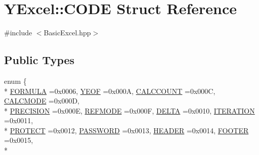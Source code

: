 \hypertarget{struct_y_excel_1_1_c_o_d_e}{}\section{Y\+Excel\+:\+:C\+O\+D\+E Struct Reference}
\label{struct_y_excel_1_1_c_o_d_e}


{\ttfamily \#include $<$Basic\+Excel.\+hpp$>$}

\subsection*{Public Types}
\begin{DoxyCompactItemize}
\item 
enum \{ \\*
\hyperlink{struct_y_excel_1_1_c_o_d_e_ae0c6be2dfa10f19c36be94a85829b00cab350171cc6990a3289727bf2ceb050f6}{F\+O\+R\+M\+U\+L\+A} =0x0006, 
\hyperlink{struct_y_excel_1_1_c_o_d_e_ae0c6be2dfa10f19c36be94a85829b00caa0f0515627add6e0d9c7cc15f8e5aa80}{Y\+E\+O\+F} =0x000\+A, 
\hyperlink{struct_y_excel_1_1_c_o_d_e_ae0c6be2dfa10f19c36be94a85829b00cabee0312e062953c2f4d948ba2feb941e}{C\+A\+L\+C\+C\+O\+U\+N\+T} =0x000\+C, 
\hyperlink{struct_y_excel_1_1_c_o_d_e_ae0c6be2dfa10f19c36be94a85829b00cae16abef91417753bf3d1b765470bc5ba}{C\+A\+L\+C\+M\+O\+D\+E} =0x000\+D, 
\\*
\hyperlink{struct_y_excel_1_1_c_o_d_e_ae0c6be2dfa10f19c36be94a85829b00cad18be021e63a4dadf61dbb1b9986167b}{P\+R\+E\+C\+I\+S\+I\+O\+N} =0x000\+E, 
\hyperlink{struct_y_excel_1_1_c_o_d_e_ae0c6be2dfa10f19c36be94a85829b00ca5186e9e84c3efedd4e9da17a38549fcb}{R\+E\+F\+M\+O\+D\+E} =0x000\+F, 
\hyperlink{struct_y_excel_1_1_c_o_d_e_ae0c6be2dfa10f19c36be94a85829b00ca56fdd0de7efa27243047b47d3cde9e2d}{D\+E\+L\+T\+A} =0x0010, 
\hyperlink{struct_y_excel_1_1_c_o_d_e_ae0c6be2dfa10f19c36be94a85829b00ca40fda8ebdbcc10e438fabbd883c2092a}{I\+T\+E\+R\+A\+T\+I\+O\+N} =0x0011, 
\\*
\hyperlink{struct_y_excel_1_1_c_o_d_e_ae0c6be2dfa10f19c36be94a85829b00ca4878cef34667706d7868587e8896c7a9}{P\+R\+O\+T\+E\+C\+T} =0x0012, 
\hyperlink{struct_y_excel_1_1_c_o_d_e_ae0c6be2dfa10f19c36be94a85829b00cacec6198c8af86bc11174e07eb1052ba0}{P\+A\+S\+S\+W\+O\+R\+D} =0x0013, 
\hyperlink{struct_y_excel_1_1_c_o_d_e_ae0c6be2dfa10f19c36be94a85829b00ca7895056ec74d691603ed54869275ffd8}{H\+E\+A\+D\+E\+R} =0x0014, 
\hyperlink{struct_y_excel_1_1_c_o_d_e_ae0c6be2dfa10f19c36be94a85829b00caf1b0dbdd6fdb508c51296f2afc4eba4a}{F\+O\+O\+T\+E\+R} =0x0015, 
\\*

\end{DoxyCompactItemize}
